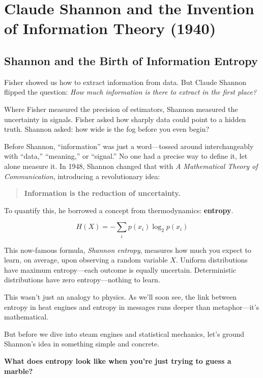 \section{Claude Shannon and the Invention of Information Theory (1940)}


\subsection{Shannon and the Birth of Information Entropy}

Fisher showed us how to extract information from data. But Claude Shannon flipped the question:  
\textit{How much information is there to extract in the first place?}

Where Fisher measured the precision of estimators, Shannon measured the uncertainty in signals. Fisher asked how sharply data could point to a hidden truth. Shannon asked: how wide is the fog before you even begin?

\medskip

Before Shannon, “information” was just a word—tossed around interchangeably with “data,” “meaning,” or “signal.” No one had a precise way to define it, let alone measure it. In 1948, Shannon changed that with \textit{A Mathematical Theory of Communication}, introducing a revolutionary idea:

\begin{quote}
\textbf{Information is the reduction of uncertainty.}
\end{quote}

To quantify this, he borrowed a concept from thermodynamics: \textbf{entropy}.

\[
H(X) = - \sum_i p(x_i) \log_2 p(x_i)
\]

This now-famous formula, \emph{Shannon entropy}, measures how much you expect to learn, on average, upon observing a random variable \( X \). Uniform distributions have maximum entropy—each outcome is equally uncertain. Deterministic distributions have zero entropy—nothing to learn.

\medskip

This wasn’t just an analogy to physics. As we’ll soon see, the link between entropy in heat engines and entropy in messages runs deeper than metaphor—it’s mathematical.

\medskip

But before we dive into steam engines and statistical mechanics, let’s ground Shannon’s idea in something simple and concrete.

\textbf{What does entropy look like when you're just trying to guess a marble?}


